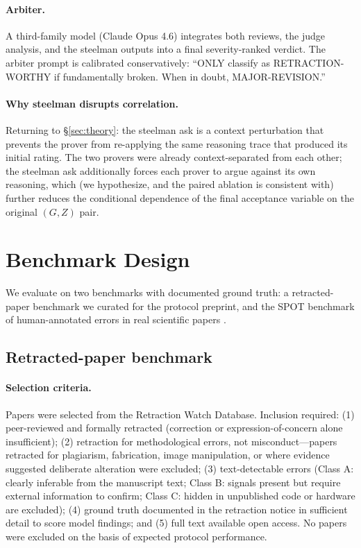 \documentclass[11pt]{article}
\theoremstyle{definition}
\begin{document}
\paragraph{Arbiter.} A third-family model (Claude Opus 4.6) integrates both reviews, the judge analysis, and the steelman outputs into a final severity-ranked verdict. The arbiter prompt is calibrated conservatively: ``ONLY classify as RETRACTION-WORTHY if fundamentally broken. When in doubt, MAJOR-REVISION.''

\paragraph{Why steelman disrupts correlation.} Returning to \S\ref{sec:theory}: the steelman ask is a context perturbation that prevents the prover from re-applying the same reasoning trace that produced its initial rating. The two provers were already context-separated from each other; the steelman ask additionally forces each prover to argue against its own reasoning, which (we hypothesize, and the paired ablation is consistent with) further reduces the conditional dependence of the final acceptance variable on the original $(G, Z)$ pair.

\section{Benchmark Design}
\label{sec:benchmarks}

We evaluate on two benchmarks with documented ground truth: a retracted-paper benchmark we curated for the protocol preprint, and the SPOT benchmark of human-annotated errors in real scientific papers \citep{son2025spot}.

\subsection{Retracted-paper benchmark}
\label{sec:bench:retracted}

\paragraph{Selection criteria.} Papers were selected from the Retraction Watch Database. Inclusion required:
(1) peer-reviewed and formally retracted (correction or expression-of-concern alone insufficient);
(2) retraction for methodological errors, not misconduct---papers retracted for plagiarism, fabrication, image manipulation, or where evidence suggested deliberate alteration were excluded;
(3) text-detectable errors (Class A: clearly inferable from the manuscript text; Class B: signals present but require external information to confirm; Class C: hidden in unpublished code or hardware are excluded);
(4) ground truth documented in the retraction notice in sufficient detail to score model findings; and
(5) full text available open access. No papers were excluded on the basis of expected protocol performance.
\end{document}
